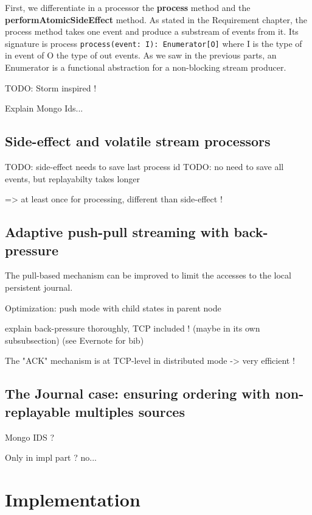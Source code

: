 First, we differentiate in a processor the \textbf{process} method and the \textbf{performAtomicSideEffect} method. As stated in the Requirement chapter, the process method 
takes one event and produce a substream of events from it. Its signature is process \verb|process(event: I): Enumerator[O]| where I is the type of in event of O the type
of out events. As we saw in the previous parts, an Enumerator is a functional abstraction for a non-blocking stream producer.



TODO: Storm inspired !

Explain Mongo Ids...

\subsection{Side-effect and volatile stream processors}

TODO: side-effect needs to save last process id
TODO: no need to save all events, but replayabilty takes longer

=> at least once for processing, different than side-effect !


\subsection{Adaptive push-pull streaming with back-pressure}

The pull-based mechanism can be improved to limit the accesses to the local persistent journal.


Optimization: push mode with child states in parent node

explain back-pressure thoroughly, TCP included ! (maybe in its own subsubsection) (see Evernote for bib)

The "ACK" mechanism is at TCP-level in distributed mode -> very efficient !


\subsection{The Journal case: ensuring ordering with non-replayable multiples sources}

Mongo IDS ?

Only in impl part ? no...



\section{Implementation}
\label{sec:streamimplementation}

